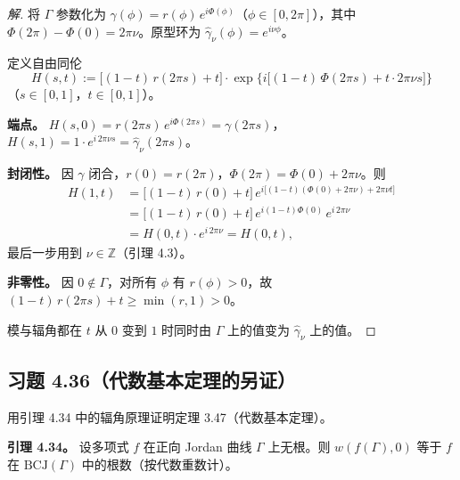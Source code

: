 \documentclass[11pt,a4paper]{article}
\newcommand{\Z}{\mathbb{Z}}
\theoremstyle{definition}
\newenvironment{solution}{\begin{proof}[解]}{\end{proof}}
\begin{document}
\begin{solution}
  将 $\Gamma$ 参数化为 $\gamma(\phi) = r(\phi)\,e^{i\Phi(\phi)}$（$\phi \in [0, 2\pi]$），其中 $\Phi(2\pi) - \Phi(0) = 2\pi\nu$。原型环为 $\hat{\gamma}_\nu(\phi) = e^{i\nu\phi}$。

  定义自由同伦
  \[
    H(s, t)
    := \bigl[(1-t)\,r(2\pi s) + t\bigr]
    \cdot \exp\bigl\{i\bigl[(1-t)\,\Phi(2\pi s)
    + t \cdot 2\pi\nu s\bigr]\bigr\}
  \]
  （$s \in [0, 1]$，$t \in [0, 1]$）。

  \textbf{端点。}\;
  $H(s, 0) = r(2\pi s)\,e^{i\Phi(2\pi s)} = \gamma(2\pi s)$，$H(s, 1) = 1 \cdot e^{i\,2\pi\nu s} = \hat{\gamma}_\nu(2\pi s)$。

  \textbf{封闭性。}\;
  因 $\gamma$ 闭合，$r(0) = r(2\pi)$，$\Phi(2\pi) = \Phi(0) + 2\pi\nu$。则
  \begin{align*}
    H(1, t)
    &= \bigl[(1-t)\,r(0) + t\bigr]\,
       e^{i\bigl[(1-t)(\Phi(0)+2\pi\nu)+2\pi\nu t\bigr]} \\
    &= \bigl[(1-t)\,r(0) + t\bigr]\,
       e^{i(1-t)\Phi(0)}\,e^{i\,2\pi\nu} \\
    &= H(0, t) \cdot e^{i\,2\pi\nu}
    = H(0, t),
  \end{align*}
  最后一步用到 $\nu \in \Z$（引理 4.3）。

  \textbf{非零性。}\;
  因 $0 \notin \Gamma$，对所有 $\phi$ 有 $r(\phi) > 0$，故 $(1-t)\,r(2\pi s) + t \ge \min(r, 1) > 0$。

  模与辐角都在 $t$ 从 $0$ 变到 $1$ 时同时由 $\Gamma$ 上的值变为 $\hat{\gamma}_\nu$ 上的值。\qedhere
\end{solution}

\subsection{习题 4.36（代数基本定理的另证）}

用引理 4.34 中的辐角原理证明定理 3.47（代数基本定理）。

\textbf{引理 4.34。}
设多项式 $f$ 在正向 Jordan 曲线 $\Gamma$ 上无根。则 $w(f(\Gamma), 0)$ 等于 $f$ 在 $\mathrm{BCJ}(\Gamma)$ 中的根数（按代数重数计）。
\end{document}
